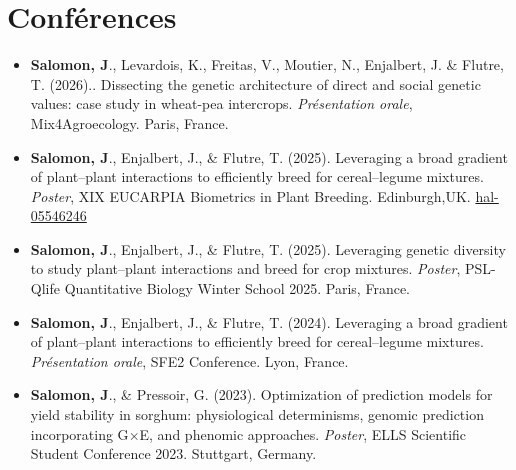 \documentclass[10pt,a4paper]{article}
\begin{document}
\section{Conférences}
\begin{itemize}[label=\textemdash, itemsep=6pt]
  \item \textbf{Salomon, J}., Levardois, K., Freitas, V., Moutier, N., Enjalbert, J. \& Flutre, T. (2026).. Dissecting the genetic architecture of direct and social genetic values: case study in wheat-pea intercrops. \textit{Présentation orale}, Mix4Agroecology. Paris, France.
  \item \textbf{Salomon, J}., Enjalbert, J., \& Flutre, T. (2025). Leveraging a broad gradient of plant--plant interactions to efficiently breed for cereal--legume mixtures. \textit{Poster}, XIX EUCARPIA Biometrics in Plant Breeding. Edinburgh,UK. \href{https://hal.inrae.fr/hal-05546246}{hal-05546246}
  \item \textbf{Salomon, J}., Enjalbert, J., \& Flutre, T. (2025). Leveraging genetic diversity to study plant--plant interactions and breed for crop mixtures. \textit{Poster}, PSL-Qlife Quantitative Biology Winter School 2025. Paris, France.
  \item \textbf{Salomon, J}., Enjalbert, J., \& Flutre, T. (2024). Leveraging a broad gradient of plant--plant interactions to efficiently breed for cereal--legume mixtures. \textit{Présentation orale}, SFE2 Conference. Lyon, France.
  \item \textbf{Salomon, J}., \& Pressoir, G. (2023). Optimization of prediction models for yield stability in sorghum: physiological determinisms, genomic prediction incorporating G$\times$E, and phenomic approaches. \textit{Poster}, ELLS Scientific Student Conference 2023. Stuttgart, Germany.
\end{itemize}

\end{document}
